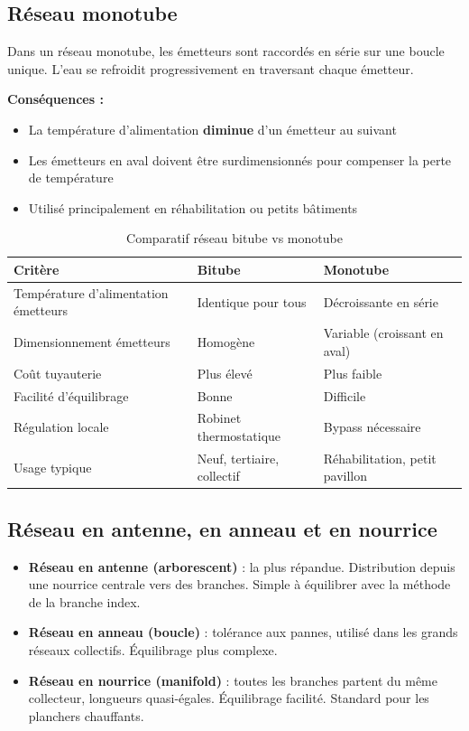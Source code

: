 \subsection{Réseau monotube}

\begin{definition}[title=Réseau monotube]
Dans un réseau monotube, les émetteurs sont raccordés en série sur une boucle unique. L'eau se refroidit progressivement en traversant chaque émetteur.

\textbf{Conséquences :}
\begin{itemize}
  \item La température d'alimentation \textbf{diminue} d'un émetteur au suivant
  \item Les émetteurs en aval doivent être surdimensionnés pour compenser la perte de température
  \item Utilisé principalement en réhabilitation ou petits bâtiments
\end{itemize}
\end{definition}

\begin{table}[H]
  \centering
  \caption{Comparatif réseau bitube vs monotube}
  \begin{tabular}{lll}
    \toprule
    Critère & Bitube & Monotube \\
    \midrule
    Température d'alimentation émetteurs & Identique pour tous & Décroissante en série \\
    Dimensionnement émetteurs & Homogène & Variable (croissant en aval) \\
    Coût tuyauterie & Plus élevé & Plus faible \\
    Facilité d'équilibrage & Bonne & Difficile \\
    Régulation locale & Robinet thermostatique & Bypass nécessaire \\
    Usage typique & Neuf, tertiaire, collectif & Réhabilitation, petit pavillon \\
    \bottomrule
  \end{tabular}
\end{table}

\subsection{Réseau en antenne, en anneau et en nourrice}

\begin{itemize}
  \item \textbf{Réseau en antenne (arborescent)} : la plus répandue. Distribution depuis une nourrice centrale vers des branches. Simple à équilibrer avec la méthode de la branche index.
  \item \textbf{Réseau en anneau (boucle)} : tolérance aux pannes, utilisé dans les grands réseaux collectifs. Équilibrage plus complexe.
  \item \textbf{Réseau en nourrice (manifold)} : toutes les branches partent du même collecteur, longueurs quasi-égales. Équilibrage facilité. Standard pour les planchers chauffants.
\end{itemize}

